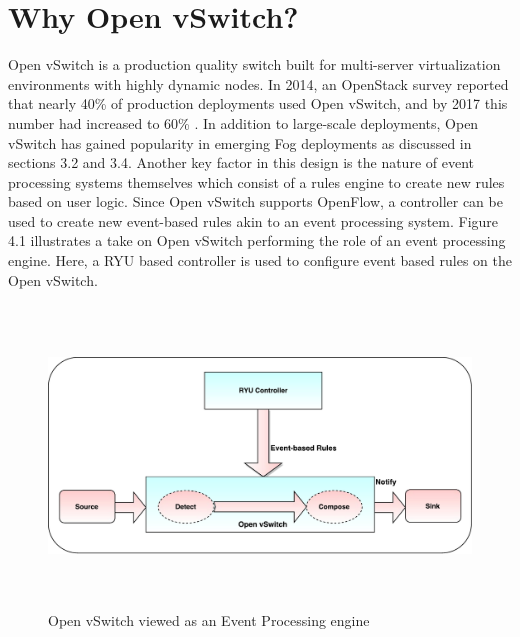 \section{Why Open vSwitch?}
Open vSwitch is a production quality switch built for multi-server virtualization environments with highly dynamic nodes. In 2014, an OpenStack survey \cite{OpenStack14} reported that nearly 40\% of production deployments used Open vSwitch, and by 2017 this number had increased to 60\% \cite{OpenStack17}. In addition to large-scale deployments, Open vSwitch has gained popularity in emerging Fog deployments as discussed in sections 3.2 and 3.4. Another key factor in this design is the nature of event processing systems themselves which consist of a rules engine to create new rules based on user logic. Since Open vSwitch supports OpenFlow, a controller can be used to create new event-based rules akin to an event processing system. Figure 4.1 illustrates a take on Open vSwitch performing the role of an event processing engine. Here, a RYU based controller is used to configure event based rules on the Open vSwitch. 
 \begin{figure}[H]
 \centering
 \caption{Open vSwitch viewed as an Event Processing engine} 
 \includegraphics[height=8cm,width=14cm]{evsep01.pdf}
\end{figure}

